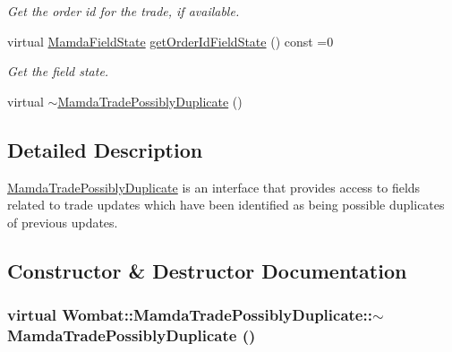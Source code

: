 \begin{CompactItemize}
\begin{CompactList}\small\item\em Get the order id for the trade, if available. \item\end{CompactList}\item 
virtual \hyperlink{namespaceWombat_93aac974f2ab713554fd12a1fa3b7d2a}{Mamda\-Field\-State} \hyperlink{classWombat_1_1MamdaTradePossiblyDuplicate_84a85c0772c805d3c0fa9f8ae5cb1a67}{get\-Order\-Id\-Field\-State} () const =0
\begin{CompactList}\small\item\em Get the field state. \item\end{CompactList}\item 
virtual \hyperlink{classWombat_1_1MamdaTradePossiblyDuplicate_2a7aee53f11e466f34e82052dff20529}{$\sim$Mamda\-Trade\-Possibly\-Duplicate} ()
\end{CompactItemize}


\subsection{Detailed Description}
\hyperlink{classWombat_1_1MamdaTradePossiblyDuplicate}{Mamda\-Trade\-Possibly\-Duplicate} is an interface that provides access to fields related to trade updates which have been identified as being possible duplicates of previous updates. 



\subsection{Constructor \& Destructor Documentation}
\hypertarget{classWombat_1_1MamdaTradePossiblyDuplicate_2a7aee53f11e466f34e82052dff20529}{
\subsubsection[$\sim$MamdaTradePossiblyDuplicate]{\setlength{\rightskip}{0pt plus 5cm}virtual Wombat::Mamda\-Trade\-Possibly\-Duplicate::$\sim$Mamda\-Trade\-Possibly\-Duplicate ()}}
\label{classWombat_1_1MamdaTradePossiblyDuplicate_2a7aee53f11e466f34e82052dff20529}




